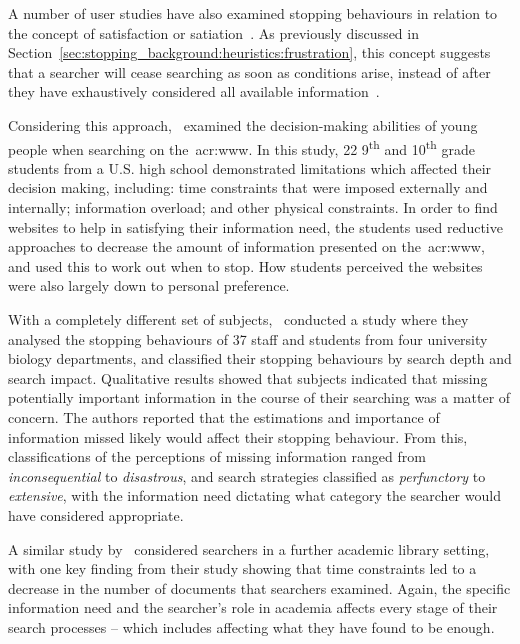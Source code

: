A number of user studies have also examined stopping behaviours in relation to the concept of satisfaction or satiation~\citep{simon1955satiation}. As previously discussed in Section~\ref{sec:stopping_background:heuristics:frustration}, this concept suggests that a searcher will cease searching as soon as conditions arise, instead of after they have exhaustively considered all available information~\citep{march1994primer}.

Considering this approach,~\cite{agosto2002satisficing} examined the decision-making abilities of young people when searching on the~\gls{acr:www}. In this study, 22 9\textsuperscript{th} and 10\textsuperscript{th} grade students from a U.S. high school demonstrated limitations which affected their decision making, including: time constraints that were imposed externally and internally; information overload; and other physical constraints. In order to find websites to help in satisfying their information need, the students used reductive approaches to decrease the amount of information presented on the~\gls{acr:www}, and used this to work out when to stop. How students perceived the websites were also largely down to personal preference.

With a completely different set of subjects,~\cite{mansourian2007search} conducted a study where they analysed the stopping behaviours of 37 staff and students from four university biology departments, and classified their stopping behaviours by search depth and search impact. Qualitative results showed that subjects indicated that missing potentially important information in the course of their searching was a matter of concern. The authors reported that the estimations and importance of information missed likely would affect their stopping behaviour. From this, classifications of the perceptions of missing information ranged from \emph{inconsequential} to \emph{disastrous}, and search strategies classified as \emph{perfunctory} to \emph{extensive}, with the information need dictating what category the searcher would have considered appropriate.

A similar study by~\cite{prabha2007enough} considered searchers in a further academic library setting, with one key finding from their study showing that time constraints led to a decrease in the number of documents that searchers examined. Again, the specific information need and the searcher's role in academia affects every stage of their search processes -- which includes affecting what they have found to be enough.

